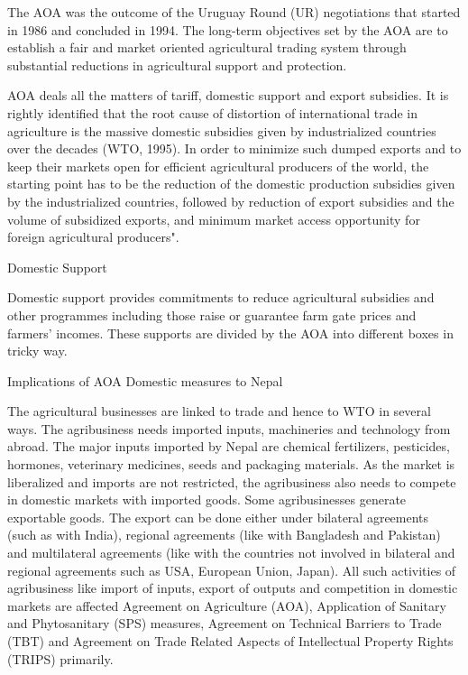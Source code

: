 \documentclass[
]{book}
\begin{document}
The AOA was the outcome of the Uruguay Round (UR) negotiations that started in 1986 and concluded in 1994. The long-term objectives set by the AOA are to establish a fair and market oriented agricultural trading system through substantial reductions in agricultural support and protection.

AOA deals all the matters of tariff, domestic support and export subsidies. It is rightly identified that the root cause of distortion of international trade in agriculture is the massive domestic subsidies given by industrialized countries over the decades (WTO, 1995). In order to minimize such dumped exports and to keep their markets open for efficient agricultural producers of the world, the starting point has to be the reduction of the domestic production subsidies given by the industrialized countries, followed by reduction of export subsidies and the volume of subsidized exports, and minimum market access opportunity for foreign agricultural producers".

Domestic Support

Domestic support provides commitments to reduce agricultural subsidies and other programmes including those raise or guarantee farm gate prices and farmers' incomes. These supports are divided by the AOA into different boxes in tricky way.

Implications of AOA Domestic measures to Nepal

The agricultural businesses are linked to trade and hence to WTO in several ways. The agribusiness needs imported inputs, machineries and technology from abroad. The major inputs imported by Nepal are chemical fertilizers, pesticides, hormones, veterinary medicines, seeds and packaging materials. As the market is liberalized and imports are not restricted, the agribusiness also needs to compete in domestic markets with imported goods. Some agribusinesses generate exportable goods. The export can be done either under bilateral agreements (such as with India), regional agreements (like with Bangladesh and Pakistan) and multilateral agreements (like with the countries not involved in bilateral and regional agreements such as USA, European Union, Japan). All such activities of agribusiness like import of inputs, export of outputs and competition in domestic markets are affected Agreement on Agriculture (AOA), Application of Sanitary and Phytosanitary (SPS) measures, Agreement on Technical Barriers to Trade (TBT) and Agreement on Trade Related Aspects of Intellectual Property Rights (TRIPS) primarily.
\end{document}
